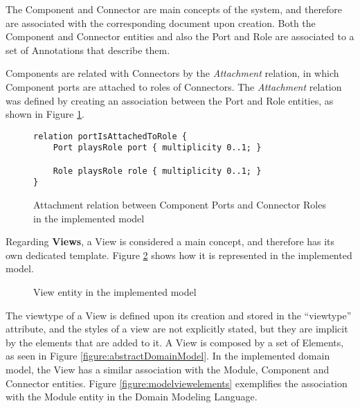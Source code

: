 \documentclass[conference]{IEEEtran}
\begin{document}
The Component and Connector are main concepts of the system, and therefore are associated with the corresponding document upon creation. Both the Component and Connector entities and also the Port and Role are associated to a set of Annotations that describe them.

Components are related with Connectors by the \textit{Attachment} relation, in which Component ports are attached to roles of Connectors. The \textit{Attachment} relation was defined by creating an association between the Port and Role entities, as shown in Figure \ref{figure:modelAttachmentRelation}.

\begin{figure}
\lstset{style=customjava}
\begin{lstlisting}
relation portIsAttachedToRole {
	Port playsRole port { multiplicity 0..1; }
	
	Role playsRole role { multiplicity 0..1; }
}
\end{lstlisting}
\caption{Attachment relation between Component Ports and Connector Roles in the implemented model}
\label{figure:modelAttachmentRelation}
\end{figure}

Regarding \textbf{Views}, a View is considered a main concept, and therefore has its own dedicated template. Figure \ref{figure:modelView} shows how it is represented in the implemented model.

\begin{figure}
\centering
\renewcommand {\umltextcolor}{black}
\renewcommand {\umlfillcolor}{none}
\renewcommand {\umldrawcolor}{black}
\caption{View entity in the implemented model}
\label{figure:modelView}
\end{figure}

The viewtype of a View is defined upon its creation and stored in the ``viewtype'' attribute, and the styles of a view are not explicitly stated, but they are implicit by the elements that are added to it. A View is composed by a set of Elements, as seen in Figure \ref{figure:abstractDomainModel}. In the implemented domain model, the View has a similar association with the Module, Component and Connector entities. Figure \ref{figure:modelviewelements} exemplifies the association with the Module entity in the Domain Modeling Language.
\end{document}
